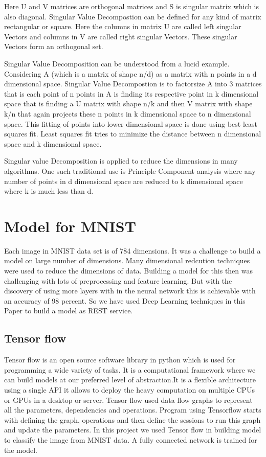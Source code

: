 {Here U and V matrices are orthogonal matrices and S is singular matrix which is
also diagonal. Singular Value Decompostion can be defined for any kind of matrix
rectangular or square. Here the columns in matrix U are called left singular
Vectors and columns in V are called right singular Vectors. These singular
Vectors form an orthogonal set. 
   
Singular Value Decomposition can be understood from a lucid example. Considering
A (which is a matrix of shape n/d) as a matrix with n points in a d dimensional
space. Singular Value Decompostion is to factorsize A into 3 matrices that is
each point of n points in A is finding its respective point in k dimensional
space that is finding a U matrix with shape n/k and then V matrix with shape k/n
that again projects these n points in k dimensional space to n dimensional
space. This fitting of points into lower dimensional space is done using best
least squares fit. Least squares fit tries to minimize the distance between n
dimensional space and k dimensional space.

Singular value Decomposition is applied to reduce the dimensions in many
algorithms. One such traditional use is Principle Component analysis where any
number of points in d dimensional space are reduced to k dimensional space where
k is much less than d.

\section{Model for MNIST}

Each image in MNIST data set is of 784 dimensions. It was a challenge to build a
model on large number of dimensions. Many dimensional redcution techniques were
used to reduce the dimensions of data. Building a model for this then was
challenging with lots of preprocessing and feature learning. But with the
discovery of using more layers with in the neural network this is achievable
with an accuracy of 98 percent. So we have used Deep Learning techniques in this
Paper to build a model as REST service.

\subsection{Tensor flow}

Tensor flow is an open source software library in python which is used for
programming a wide variety of tasks. It is a computational framework where we
can build models at our preferred level of abstraction.It is a flexible
architecture using a single API it allows to deploy the heavy computation on
multiple CPUs or GPUs in a desktop or server. Tensor flow used data flow graphs
to represent all the parameters, dependencies and operations. Program using
Tensorflow starts with defining the graph, operations and then define the
sessions to run this graph and update the parameters. In this project we used
Tensor flow in building model to classify the image from MNIST data. A fully
connected network is trained for the model.

}
